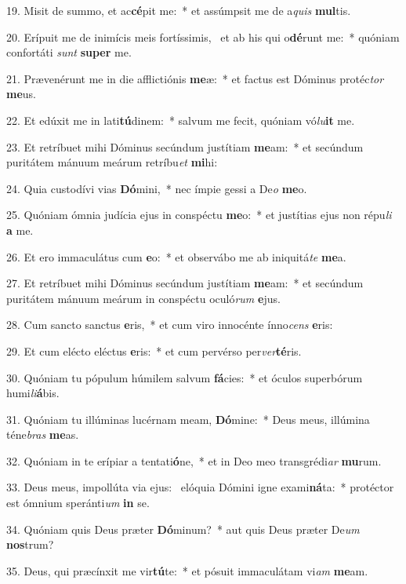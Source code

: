 19. Misit de summo, et ac\textbf{cé}pit me:~*  et assúmpsit me de a\textit{quis} \textbf{mul}tis.\

20. Erípuit me de inimícis meis fortíssimis, \dag\  et ab his qui o\textbf{dé}runt me:~*  quóniam confortáti \textit{sunt} \textbf{su}\textbf{per} me.\

21. Prævenérunt me in die afflictiónis \textbf{me}æ:~*  et factus est Dóminus protéc\textit{tor} \textbf{me}us.\

22. Et edúxit me in lati\textbf{tú}dinem:~*  salvum me fecit, quóniam vó\textit{lu}\textbf{it} me.\

23. Et retríbuet mihi Dóminus secúndum justítiam \textbf{me}am:~*  et secúndum puritátem mánuum meárum retríbu\textit{et} \textbf{mi}hi:\

24. Quia custodívi vias \textbf{Dó}mini,~*  nec ímpie gessi a De\textit{o} \textbf{me}o.\

25. Quóniam ómnia judícia ejus in conspéctu \textbf{me}o:~*  et justítias ejus non répu\textit{li} \textbf{a} me.\

26. Et ero immaculátus cum \textbf{e}o:~*  et observábo me ab iniquitá\textit{te} \textbf{me}a.\

27. Et retríbuet mihi Dóminus secúndum justítiam \textbf{me}am:~*  et secúndum puritátem mánuum meárum in conspéctu oculó\textit{rum} \textbf{e}jus.\

28. Cum sancto sanctus \textbf{e}ris,~*  et cum viro innocénte ínno\textit{cens} \textbf{e}ris:\

29. Et cum elécto eléctus \textbf{e}ris:~*  et cum pervérso per\textit{ver}\textbf{té}ris.\

30. Quóniam tu pópulum húmilem salvum \textbf{fá}cies:~*  et óculos superbórum humi\textit{li}\textbf{á}bis.\

31. Quóniam tu illúminas lucérnam meam, \textbf{Dó}mine:~*  Deus meus, illúmina téne\textit{bras} \textbf{me}as.\

32. Quóniam in te erípiar a tentati\textbf{ó}ne,~*  et in Deo meo transgrédi\textit{ar} \textbf{mu}rum.\

33. Deus meus, impollúta via ejus: \dag\  elóquia Dómini igne exami\textbf{ná}ta:~*  protéctor est ómnium speránti\textit{um} \textbf{in} se.\

34. Quóniam quis Deus præter \textbf{Dó}minum?~*  aut quis Deus præter De\textit{um} \textbf{nos}trum?\

35. Deus, qui præcínxit me vir\textbf{tú}te:~*  et pósuit immaculátam vi\textit{am} \textbf{me}am.\

